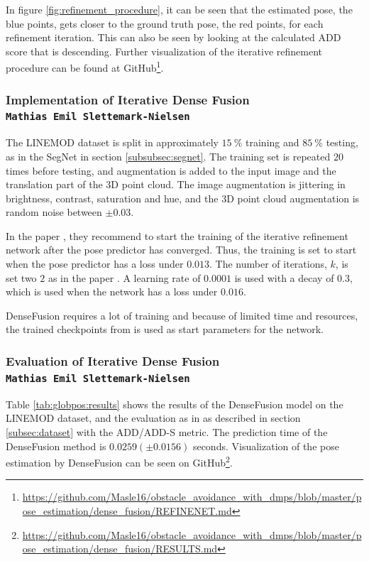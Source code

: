 \documentclass[../main.tex]{subfiles}
\begin{document}
In figure \ref{fig:refinement_procedure}, it can be seen that the estimated pose, the blue points, gets closer to the ground truth pose, the red points, for each refinement iteration. This can also be seen by looking at the calculated ADD score that is descending. Further visualization of the iterative refinement procedure can be found at GitHub\footnote{\url{https://github.com/Masle16/obstacle_avoidance_with_dmps/blob/master/pose_estimation/dense_fusion/REFINENET.md}}.

\subsubsection{Implementation of Iterative Dense Fusion\\ \normalfont\normalsize\texttt{Mathias Emil Slettemark-Nielsen}} \label{subsubsec:imp_dense_fusion}
The LINEMOD dataset is split in approximately $15\ \%$ training and $85\ \%$ testing, as in the SegNet in section \ref{subsubsec:segnet}. The training set is repeated $20$ times before testing, and augmentation is added to the input image and the translation part of the 3D point cloud. The image augmentation is jittering in brightness, contrast, saturation and hue, and the 3D point cloud augmentation is random noise between $\pm0.03$.

In the paper \cite{densefusion}, they recommend to start the training of the iterative refinement network after the pose predictor has converged. Thus, the training is set to start when the pose predictor has a loss under $0.013$. The number of iterations, $k$, is set two $2$ as in the paper \cite{densefusion}. A learning rate of $0.0001$ is used with a decay of $0.3$, which is used when the network has a loss under $0.016$.

DenseFusion requires a lot of training and because of limited time and resources, the trained checkpoints from \cite{densefusion} is used as start parameters for the network.

\subsubsection{Evaluation of Iterative Dense Fusion\\ \normalfont\normalsize\texttt{Mathias Emil Slettemark-Nielsen}} \label{subsubsec:eval_dense_fusion}
Table \ref{tab:globpos:results} shows the results of the DenseFusion model on the LINEMOD dataset, and the evaluation as in \cite{linemod_matching_score} as described in section \ref{subsec:dataset} with the ADD/ADD-S metric. The prediction time of the DenseFusion method is $0.0259(\pm 0.0156)$ seconds. Visualization of the pose estimation by DenseFusion can be seen on GitHub\footnote{\url{https://github.com/Masle16/obstacle_avoidance_with_dmps/blob/master/pose_estimation/dense_fusion/RESULTS.md}}.
\end{document}
